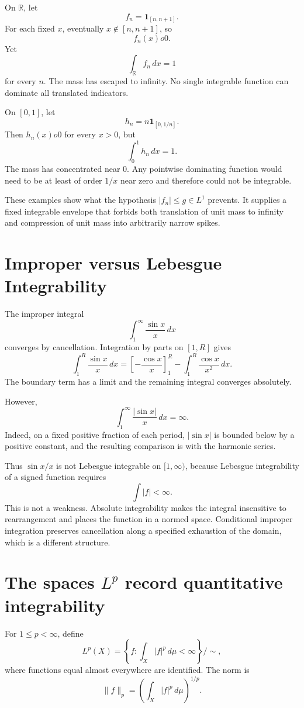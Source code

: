 On \(\mathbb R\), let
\[
  f_n=\mathbf1_{[n,n+1]}.
\]
For each fixed \(x\), eventually \(x\notin[n,n+1]\), so
\[
  f_n(x)	o0.
\]
Yet
\[
  \int_{\mathbb R}f_n\,dx=1
\]
for every \(n\).  The mass has escaped to infinity.  No single integrable function can dominate all translated indicators.

On \([0,1]\), let
\[
  h_n=n\mathbf1_{[0,1/n]}.
\]
Then \(h_n(x)	o0\) for every \(x>0\), but
\[
  \int_0^1h_n\,dx=1.
\]
The mass has concentrated near \(0\).  Any pointwise dominating function would need to be at least of order \(1/x\) near zero and therefore could not be integrable.

These examples show what the hypothesis \(|f_n|\le g\in L^1\) prevents.  It supplies a fixed integrable envelope that forbids both translation of unit mass to infinity and compression of unit mass into arbitrarily narrow spikes.

\section{Improper versus Lebesgue Integrability}

The improper integral
\[
  \int_1^{\infty}\frac{\sin x}{x}\,dx
\]
converges by cancellation.  Integration by parts on \([1,R]\) gives
\[
  \int_1^R\frac{\sin x}{x}\,dx
  =\left[-\frac{\cos x}{x}\right]_1^R
   -\int_1^R\frac{\cos x}{x^2}\,dx.
\]
The boundary term has a limit and the remaining integral converges absolutely.

However,
\[
  \int_1^{\infty}\frac{|\sin x|}{x}\,dx=\infty.
\]
Indeed, on a fixed positive fraction of each period, \(|\sin x|\) is bounded below by a positive constant, and the resulting comparison is with the harmonic series.

Thus \(\sin x/x\) is not Lebesgue integrable on \([1,\infty)\), because Lebesgue integrability of a signed function requires
\[
  \int|f|<\infty.
\]
This is not a weakness.  Absolute integrability makes the integral insensitive to rearrangement and places the function in a normed space.  Conditional improper integration preserves cancellation along a specified exhaustion of the domain, which is a different structure.

\section{The spaces \texorpdfstring{$L^p$}{Lp} record quantitative integrability}

For \(1\le p<\infty\), define
\[
  L^p(X)=
  \left\{f:\int_X|f|^p\,d\mu<\infty\right\}/\!\sim,
\]
where functions equal almost everywhere are identified.  The norm is
\[
  \|f\|_p=\left(\int_X|f|^p\,d\mu\right)^{1/p}.
\]

